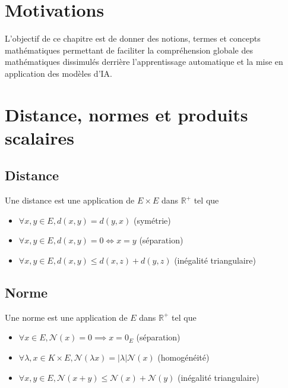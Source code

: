 \section{Motivations}

\noindent L'objectif de ce chapitre est de donner des notions, termes et concepts mathématiques permettant de faciliter la compréhension globale des mathématiques dissimulés derrière l'apprentissage automatique
et la mise en application des modèles d'IA.

\section{Distance, normes et produits scalaires}

\subsection{Distance}

\noindent Une distance est une application de $E \times E$ dans $\mathbb{R}^{+}$ tel que \newline

\begin{itemize}
    \item $\forall x, y \in E, d(x,y) = d(y,x)$ (symétrie) \newline
    \item $\forall x, y \in E, d(x,y) = 0 \Longleftrightarrow x = y$ (séparation) \newline
    \item $\forall x, y \in E, d(x,y) \le d(x,z) + d(y,z)$ (inégalité triangulaire) \newline
\end{itemize}

\subsection{Norme} 

\noindent Une norme est une application de $E$ dans $\mathbb{R}^{+}$ tel que \newline

\begin{itemize}
    \item $\forall x \in E, \mathcal{N}(x) = 0 \implies x =  0_E$ (séparation) \newline
    \item $\forall \lambda, x \in K \times E, \mathcal{N}(\lambda x) = |\lambda| \mathcal{N}(x)$ (homogénéité) \newline
    \item $\forall x, y \in E, \mathcal{N}(x + y) \le \mathcal{N}(x) + \mathcal{N}(y)$ (inégalité triangulaire) \newline
\end{itemize}

